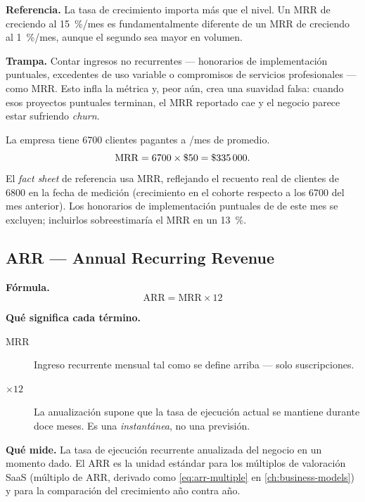 \textbf{Referencia.} La tasa de crecimiento importa más que el nivel. Un MRR de 
creciendo al \qty{15}{\percent}/mes es fundamentalmente diferente de un MRR de 
creciendo al \qty{1}{\percent}/mes, aunque el segundo sea mayor en volumen.

\textbf{Trampa.} Contar ingresos no recurrentes --- honorarios de implementación puntuales,
excedentes de uso variable o compromisos de servicios profesionales --- como MRR. Esto infla
la métrica y, peor aún, crea una suavidad falsa: cuando esos proyectos puntuales terminan,
el MRR reportado cae y el negocio parece estar sufriendo \emph{churn}.

\begin{example}
La empresa tiene \num{6700} clientes pagantes a /mes de promedio.
\[
  \mathrm{MRR} = \num{6700} \times \$\num{50} = \$\num{335000}.
\]
El \emph{fact sheet} de referencia usa  MRR, reflejando el recuento real de
clientes de \num{6800} en la fecha de medición (crecimiento en el cohorte respecto a los
\num{6700} del mes anterior). Los honorarios de implementación puntuales de 
de este mes se excluyen; incluirlos sobreestimaría el MRR en un \qty{13}{\percent}.
\end{example}


\subsection{ARR --- Annual Recurring Revenue}

\textbf{Fórmula.}
\[
  \mathrm{ARR} = \mathrm{MRR} \times 12
\]

\textbf{Qué significa cada término.}
\begin{description}
  \item[MRR] Ingreso recurrente mensual tal como se define arriba --- solo suscripciones.
  \item[$\times 12$] La anualización supone que la tasa de ejecución actual se mantiene
    durante doce meses. Es una \emph{instantánea}, no una previsión.
\end{description}

\textbf{Qué mide.} La tasa de ejecución recurrente anualizada del negocio en un momento
dado. El ARR es la unidad estándar para los múltiplos de valoración SaaS (múltiplo de ARR,
derivado como \cref{eq:arr-multiple} en \cref{ch:business-models}) y para la comparación del
crecimiento año contra año.

